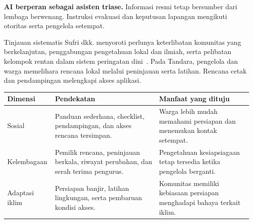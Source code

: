 \documentclass[10pt,a4paper]{article}
\begin{document}
\begin{Callout}
\textbf{AI berperan sebagai asisten triase.} Informasi resmi tetap bersumber dari lembaga berwenang. Instruksi evakuasi dan keputusan lapangan mengikuti otoritas serta pengelola setempat.
\end{Callout}
\newpage

Tinjauan sistematis Sufri dkk. menyoroti perlunya keterlibatan komunitas yang berkelanjutan, penggabungan pengetahuan lokal dan ilmiah, serta pelibatan kelompok rentan dalam sistem peringatan dini~\cite{sufri2020}. Pada Tandara, pengelola dan warga memelihara rencana lokal melalui peninjauan serta latihan. Rencana cetak dan pendampingan melengkapi akses aplikasi.

\begin{tabularx}{\linewidth}{@{}P{28mm}YY@{}}
\toprule{}\textbf{Dimensi} & \textbf{Pendekatan} & \textbf{Manfaat yang dituju}\\\midrule
Sosial & Panduan sederhana, checklist, pendampingan, dan akses rencana tersimpan. & Warga lebih mudah memahami persiapan dan menemukan kontak setempat.\\
Kelembagaan & Pemilik rencana, peninjauan berkala, riwayat perubahan, dan serah terima pengurus. & Pengetahuan kesiapsiagaan tetap tersedia ketika pengelola berganti.\\
Adaptasi iklim & Persiapan banjir, latihan lingkungan, serta pembaruan kondisi akses. & Komunitas memiliki kebiasaan persiapan menghadapi bahaya terkait iklim.\\\bottomrule
\end{tabularx}

\begin{center}\end{center}
\end{document}
